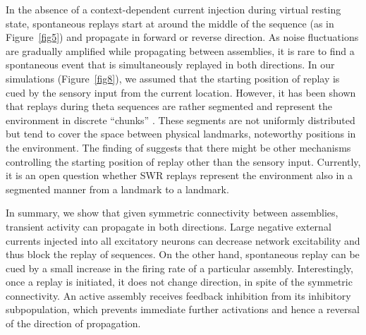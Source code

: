     In the absence of a context-dependent current injection during virtual
    resting state, spontaneous replays start at around the middle of the
    sequence (as in Figure~\ref{fig5}) and propagate in forward or reverse
    direction. As noise fluctuations are gradually amplified while propagating
    between assemblies, it is rare to find a spontaneous event that is
    simultaneously replayed in both directions. In our simulations
    (Figure~\ref{fig8}), we assumed that the starting position of replay is cued
    by the sensory input from the current location. However, it has been shown
    that replays during theta sequences are rather segmented and represent the
    environment in discrete ``chunks'' \citep{Gupta2012}. These segments are not
    uniformly distributed but tend to cover the space between physical
    landmarks, noteworthy positions in the environment. The finding of
    \cite{Gupta2012} suggests that there might be other mechanisms
    controlling the starting position of replay other than the sensory input.
    Currently, it is an open question whether SWR replays represent the
    environment also in a segmented manner from a landmark to a landmark.

    In summary, we show that given symmetric connectivity between assemblies,
    transient activity can propagate in both directions. Large negative external
    currents injected into all excitatory neurons can decrease network
    excitability and thus block the replay of sequences. On the other hand,
    spontaneous replay can be cued by a small increase in the firing rate of a
    particular assembly. Interestingly, once a replay is initiated, it does not
    change direction, in spite of the symmetric connectivity. An active assembly
    receives feedback inhibition from its inhibitory subpopulation, which
    prevents immediate further activations and hence a reversal of the direction
    of propagation.

